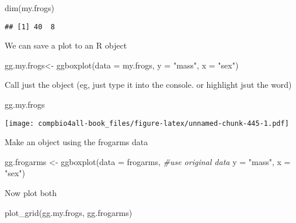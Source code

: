 \documentclass[
]{book}
\newenvironment{Shaded}{\begin{snugshade}}{\end{snugshade}}
\newcommand{\AttributeTok}[1]{\textcolor[rgb]{0.77,0.63,0.00}{#1}}
\newcommand{\CommentTok}[1]{\textcolor[rgb]{0.56,0.35,0.01}{\textit{#1}}}
\newcommand{\FunctionTok}[1]{\textcolor[rgb]{0.00,0.00,0.00}{#1}}
\newcommand{\NormalTok}[1]{#1}
\newcommand{\OtherTok}[1]{\textcolor[rgb]{0.56,0.35,0.01}{#1}}
\newcommand{\StringTok}[1]{\textcolor[rgb]{0.31,0.60,0.02}{#1}}
\begin{document}
\begin{Shaded}
\begin{Highlighting}[]
\FunctionTok{dim}\NormalTok{(my.frogs)}
\end{Highlighting}
\end{Shaded}

\begin{verbatim}
## [1] 40  8
\end{verbatim}

We can save a plot to an R object

\begin{Shaded}
\begin{Highlighting}[]
\NormalTok{gg.my.frogs}\OtherTok{\textless{}{-}} \FunctionTok{ggboxplot}\NormalTok{(}\AttributeTok{data =}\NormalTok{ my.frogs,}
          \AttributeTok{y =} \StringTok{"mass"}\NormalTok{,}
          \AttributeTok{x =} \StringTok{"sex"}\NormalTok{)}
\end{Highlighting}
\end{Shaded}

Call just the object (eg, just type it into the console. or highlight jsut the word)

\begin{Shaded}
\begin{Highlighting}[]
\NormalTok{gg.my.frogs}
\end{Highlighting}
\end{Shaded}

\texttt{[image: compbio4all-book\_files/figure-latex/unnamed-chunk-445-1.pdf]}

Make an object using the frogarms data

\begin{Shaded}
\begin{Highlighting}[]
\NormalTok{gg.frogarms }\OtherTok{\textless{}{-}} \FunctionTok{ggboxplot}\NormalTok{(}\AttributeTok{data =}\NormalTok{ frogarms, }\CommentTok{\#use original data}
          \AttributeTok{y =} \StringTok{"mass"}\NormalTok{,}
          \AttributeTok{x =} \StringTok{"sex"}\NormalTok{)}
\end{Highlighting}
\end{Shaded}

Now plot both

\begin{Shaded}
\begin{Highlighting}[]
\FunctionTok{plot\_grid}\NormalTok{(gg.my.frogs,}
\NormalTok{          gg.frogarms)}
\end{Highlighting}
\end{Shaded}
\end{document}
